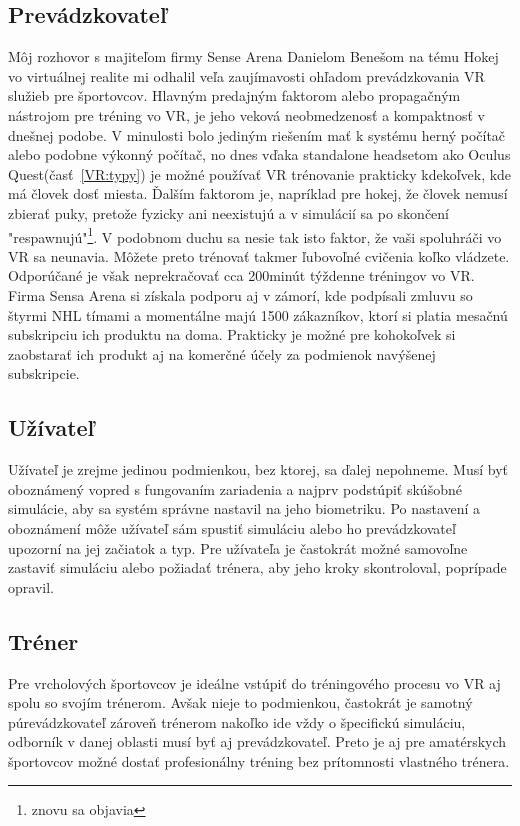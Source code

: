 \documentclass[10pt,twoside,slovak,a4paper]{article}										%
\begin{document}
\subsection{Prevádzkovateľ}\label{PR:boss}
Môj rozhovor s majiteľom firmy Sense Arena Danielom Benešom na tému Hokej vo virtuálnej realite mi odhalil veľa zaujímavosti ohľadom prevádzkovania VR služieb pre športovcov. Hlavným predajným faktorom alebo propagačným nástrojom pre tréning vo VR, je jeho veková neobmedzenosť a kompaktnosť v dnešnej podobe. V minulosti bolo jediným riešením mať k systému herný počítač alebo podobne výkonný počítač, no dnes vďaka standalone headsetom ako Oculus Quest(časť~\ref{VR:typy}) je možné používať VR trénovanie prakticky kdekoľvek, kde má človek dosť miesta.  Ďalším faktorom je, napríklad pre hokej, že človek nemusí zbierať puky, pretože fyzicky ani neexistujú a v simulácií sa po skončení "respawnujú"\footnote{znovu sa objavia}. V podobnom duchu sa nesie tak isto faktor, že vaši spoluhráči vo VR sa neunavia. Môžete preto trénovať takmer ľubovoľné cvičenia koľko vládzete. Odporúčané je však neprekračovať cca 200minút týždenne tréningov vo VR. Firma Sensa Arena si získala podporu aj v zámorí, kde podpísali zmluvu so štyrmi NHL tímami a momentálne majú 1500 zákazníkov, ktorí si platia mesačnú subskripciu ich produktu na doma. Prakticky je možné pre kohokoľvek si zaobstarať ich produkt aj na komerčné účely za podmienok navýšenej subskripcie.

\subsection {Užívateľ} \label{PR:user}
Užívateľ je zrejme jedinou podmienkou, bez ktorej, sa ďalej nepohneme. Musí byť oboznámený vopred s fungovaním zariadenia a najprv podstúpiť skúšobné simulácie, aby sa systém správne nastavil na jeho biometriku. Po nastavení a oboznámení môže užívateľ sám spustiť simuláciu alebo ho prevádzkovateľ upozorní na jej začiatok a typ. Pre užívateľa je častokrát možné samovoľne zastaviť simuláciu alebo požiadať trénera, aby jeho kroky skontroloval, poprípade opravil.

\subsection {Tréner} \label{PR:trendo}
Pre vrcholových športovcov je ideálne vstúpiť do tréningového procesu vo VR aj spolu so svojím trénerom. Avšak nieje to podmienkou, častokrát je samotný púrevádzkovateľ zároveň trénerom nakoľko ide vždy o špecifickú simuláciu, odborník v danej oblasti musí byť aj prevádzkovateľ. Preto je aj pre amatérskych športovcov možné dostať profesionálny tréning bez prítomnosti vlastného trénera.
\end{document}
